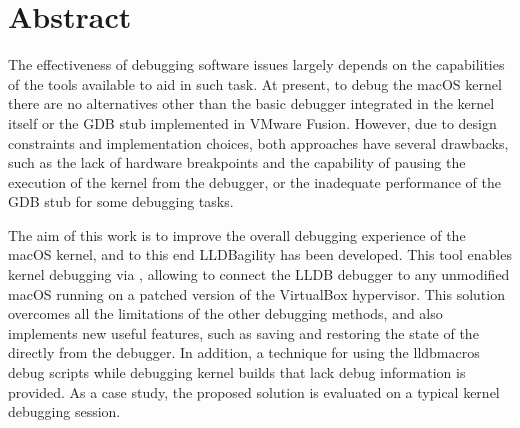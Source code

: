 \chapter{Abstract}
The effectiveness of debugging software issues largely depends on the capabilities of the tools available to aid in such task. At present, to debug the macOS kernel there are no alternatives other than the basic debugger integrated in the kernel itself or the GDB stub implemented in VMware Fusion. However, due to design constraints and implementation choices, both approaches have several drawbacks, such as the lack of hardware breakpoints and the capability of pausing the execution of the kernel from the debugger, or the inadequate performance of the GDB stub for some debugging tasks.

The aim of this work is to improve the overall debugging experience of the macOS kernel, and to this end LLDBagility has been developed. This tool enables kernel debugging via , allowing to connect the LLDB debugger to any unmodified macOS  running on a patched version of the VirtualBox hypervisor. This solution overcomes all the limitations of the other debugging methods, and also implements new useful features, such as saving and restoring the state of the  directly from the debugger. In addition, a technique for using the lldbmacros debug scripts while debugging kernel builds that lack debug information is provided. As a case study, the proposed solution is evaluated on a typical kernel debugging session.

